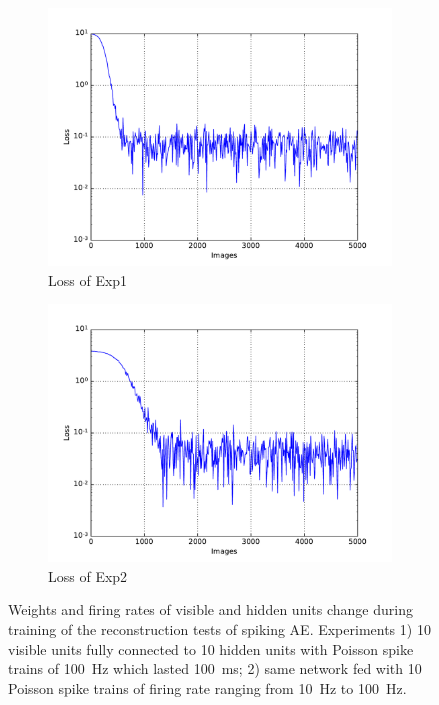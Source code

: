 \begin{figure}
\begin{subfigure}[t]{0.4\textwidth}
		\includegraphics[width=\textwidth]{pics_sdlm/03_exp_SAE_noise_long/exp1_mse_nons.pdf}
		\caption{Loss of Exp1}
	\end{subfigure}
	\begin{subfigure}[t]{0.4\textwidth}
		\includegraphics[width=\textwidth]{pics_sdlm/03_exp_SAE_noise_long/exp2_mse_nons.pdf}
		\caption{Loss of Exp2}
	\end{subfigure}
	\caption{Weights and firing rates of visible and hidden units change during training of the reconstruction tests of spiking AE. 
		Experiments 1) 10 visible units fully connected to 10 hidden units with Poisson spike trains of 100~Hz which lasted 100~ms; 2) same network fed with 10 Poisson spike trains of firing rate ranging from 10~Hz to 100~Hz.}
\end{figure}


